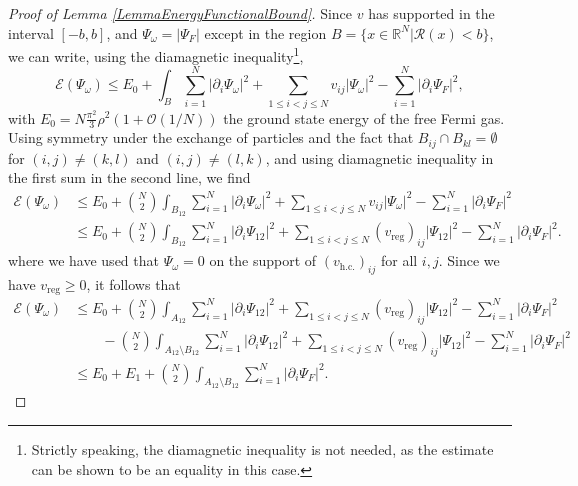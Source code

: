 \documentclass[a4paper,11pt]{article}
\newcommand{\abs}[1]{\left\lvert #1 \right\rvert}
\newcommand{\R}{\mathbb{R}}
\newcommand{\rr}{\mathcal{R}}
\numberwithin{equation}{section}
\begin{document}
	\begin{proof}[Proof of Lemma \ref{LemmaEnergyFunctionalBound}]
		Since $ v $ has supported in the interval $[-b,b]$, and $ \Psi_\omega=\abs{\Psi_F} $ except in the region $ B=\{x\in\R^N \vert \rr(x)<b \} $, we can write, using the diamagnetic inequality\footnote{Strictly speaking, the diamagnetic inequality is not needed, as the estimate can be shown to be an equality in this case.},
        \begin{equation}
		\mathcal{E}(\Psi_\omega)\leq E_0+\int_B \sum_{i=1}^{N}\abs{\partial_i\Psi_\omega}^2+\sum_{1\leq i<j\leq N}v_{ij}\abs{\Psi_\omega}^2-\sum_{i=1}^{N}\abs{\partial_i\Psi_F}^2,
		\end{equation}
		with $ E_0=N\frac{\pi^2}{3}\rho^2(1+\mathcal{O}(1/N)) $ the ground state energy of the free Fermi gas. Using symmetry under the exchange of particles and the fact that $B_{ij}\cap B_{kl}=\emptyset$ for $(i,j)\neq (k,l)$ and $(i,j)\neq (l,k)$, and using diamagnetic inequality in the first sum in the second line, we find \begin{equation}
		\begin{aligned}
		\mathcal{E}(\Psi_\omega)&\leq E_0+\binom{N}{2}\int_{B_{12}} \sum_{i=1}^{N}\abs{\partial_i\Psi_\omega}^2+\sum_{1\leq i<j\leq N}v_{ij}\abs{\Psi_\omega}^2-\sum_{i=1}^{N}\abs{\partial_i\Psi_F}^2\\&
		\leq E_0+\binom{N}{2}\int_{B_{12}} \sum_{i=1}^{N}\abs{\partial_i\Psi_{12}}^2+\sum_{1\leq i<j\leq N}(v_{\text{reg}})_{ij}\abs{\Psi_{12}}^2-\sum_{i=1}^{N}\abs{\partial_i\Psi_F}^2.
		\end{aligned}
		\end{equation}
		where we have used that $ \Psi_\omega=0 $ on the support of $ (v_{\text{h.c.}})_{ij} $ for all $ i,j $. Since we have $ v_{\text{reg}}\geq0 $, it follows that
		\begin{equation}
		\begin{aligned}
		\mathcal{E}(\Psi_\omega)&\leq E_0+\binom{N}{2}\int_{A_{12}} \sum_{i=1}^{N}\abs{\partial_i\Psi_{12}}^2+\sum_{1\leq i<j\leq N}(v_{\text{reg}})_{ij}\abs{\Psi_{12}}^2-\sum_{i=1}^{N}\abs{\partial_i\Psi_F}^2\\&\qquad
		-\binom{N}{2}\int_{A_{12}\setminus B_{12}} \sum_{i=1}^{N}\abs{\partial_i\Psi_{12}}^2+\sum_{1\leq i<j\leq N}(v_{\text{reg}})_{ij}\abs{\Psi_{12}}^2-\sum_{i=1}^{N}\abs{\partial_i\Psi_F}^2\\&
		\leq E_0+E_1+\binom{N}{2}\int_{A_{12}\setminus B_{12}}\sum_{i=1}^{N}\abs{\partial_i\Psi_F}^2.
		\end{aligned}

\end{equation}
\end{proof}
\end{document}
